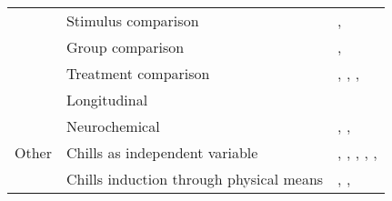 \begin{table}[t!]
\begin{threeparttable}
\begin{tabular*}{\textwidth}{
    >{\raggedright}p{}
    >{\raggedright}p{}
    >{\raggedright\arraybackslash}p{}}
\cline{2-3}
& Stimulus comparison & 
    \textcite{beier2020}, \textcite{goodchild2019} \\ 

\cline{2-3}
& Group comparison & 
    \textcite{beier2020}, \textcite{grewe2009a} \\ 

\cline{2-3}
& Treatment comparison & 
    \textcite{egermann2011}, \textcite{schoeller2016}, \textcite{schoeller2018a}, \textcite{sutherland2009} \\ 
    
\cline{2-3}
& Longitudinal & 
    \textcite{grewe2007} \\ 

\cline{2-3}
& Neurochemical & 
    \textcite{ferreri2019}, \textcite{goldstein1980}, \textcite{starcke2019} \\
                       
\hline
Other & Chills as independent variable & 
    \textcite{carr2016}, \textcite{fukui2014}, \textcite{konecni2007b}, \textcite{lee2008}, \textcite{mathis2017}, \textcite{park2019} \\
    
\cline{2-3}
& Chills induction through physical means & 
    \textcite{fukushima2012}, \textcite{ishikawa2019}, \textcite{schoeller2019b} \\
    
\hline

\end{tabular*}
\end{threeparttable}
\end{table}